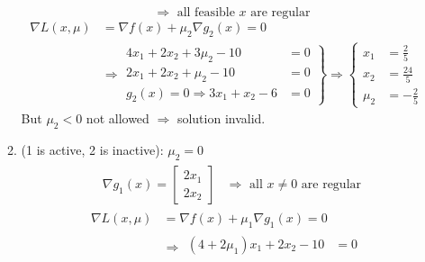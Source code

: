 \documentclass[11pt,a4paper]{article}
\begin{document}
\begin{enumerate}[$\bullet$]
\begin{enumerate}[(1)]
\begin{equation}
\begin{aligned}
            \end{aligned}\Rightarrow \text{ all feasible $x$ are regular}
            \nonumber
        \end{equation}
        \begin{equation}
            \begin{aligned}
                \nabla L(x,\mu)&=\nabla f(x)+\mu_2 \nabla g_2(x)=0\\
                &\Rightarrow \left.\begin{matrix}
                   4x_1+2x_2+3\mu_2-10&=0\\
                   2x_1+2x_2+\mu_2-10&=0\\
                   g_2(x)=0 \Rightarrow 3x_1+x_2-6&=0
                \end{matrix}\right\}\Rightarrow	\left\{\begin{matrix}
                    x_1&=\frac{2}{5}\\
                    x_2&=\frac{24}{5}\\
                    \mu_2&=-\frac{2}{5}
                \end{matrix}\right.
            \end{aligned}
            \nonumber
        \end{equation}
        But $\mu_2<0$ not allowed $\Rightarrow$ solution invalid.
        \item (1 is active, 2 is inactive): $\mu_2=0$
        \begin{equation}
            \begin{aligned}
                \begin{aligned}
                    \nabla g_1(x)=\begin{bmatrix}
                        2x_1\\
                        2x_2
                    \end{bmatrix}
                \end{aligned}
            \end{aligned}\Rightarrow \text{ all $x\neq 0$ are regular}
            \nonumber
        \end{equation}
        \begin{equation}
            \begin{aligned}
                \nabla L(x,\mu)&=\nabla f(x)+\mu_1 \nabla g_1(x)=0\\
                &\Rightarrow \left.\begin{matrix}
                   (4+2\mu_1)x_1+2x_2-10&=0\\

\end{matrix}
\end{aligned}
\end{equation}
\end{enumerate}
\end{enumerate}
\end{document}
